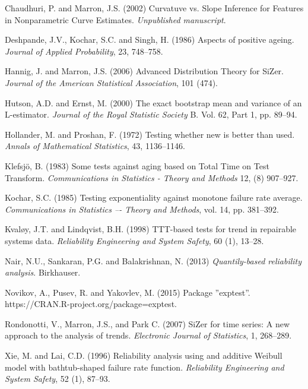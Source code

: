 \documentclass[preprint,12pt]{elsarticle}
\begin{document}
\begin{thebibliography}{}
 Chaudhuri, P. and Marron, J.S. (2002) Curvatuve vs. Slope Inference for Features in Nonparametric Curve Estimates. {\it Unpublished manuscript}.

 Deshpande, J.V., Kochar, S.C. and Singh, H. (1986) Aspects of positive ageing. \textit{Journal of Applied  Probability}, 23, 748--758.

 Hannig, J. and Marron, J.S. (2006) Advanced Distribution Theory for SiZer. \textit{Journal of the American Statistical Association}, 101 (474). 

 Hutson, A.D. and Ernst, M. (2000) The exact bootstrap mean and variance of an L-estimator. \textit{Journal of the Royal Statistic Society} B. Vol. 62, Part 1, pp. 89--94.

  Hollander, M. and Proshan, F. (1972) Testing whether new is better than used. {\it Annals of Mathematical Statistics},  43, 1136--1146.


 Klefsjö, B. (1983) Some tests against aging based on Total Time on Test Transform. {\it Communications in Statistics - Theory and Methods} 12, (8) 907--927.


 Kochar, S.C. (1985) Testing exponentiality against monotone failure rate average. {\it Communications in Statistics –- Theory and Methods}, vol. 14, pp. 381–392.

 Kvaløy, J.T. and Lindqvist, B.H. (1998) TTT-based tests for trend in repairable systems data. {\it Reliability Engineering and System Safety}, 60 (1), 13--28.




 Nair, N.U., Sankaran, P.G. and Balakrishnan, N. (2013) {\it Quantily-based reliability analysis}. Birkhauser.

 Novikov, A., Pusev, R. and Yakovlev, M. (2015) Package ''exptest''.  https://CRAN.R-project.org/package=exptest.

 Rondonotti, V., Marron, J.S., and Park C. (2007) SiZer for time series: A new approach to the analysis of trends. {\it Electronic Journal of Statistics}, 1, 268--289.

 Xie, M. and Lai, C.D. (1996) Reliability analysis using and additive Weibull model with bathtub-shaped failure rate function. {\it Reliability Engineering and System Safety}, 52 (1), 87--93.
\end{thebibliography}
\end{document}
